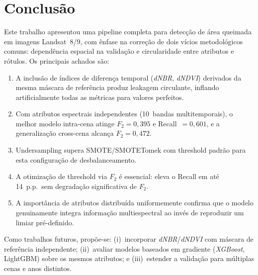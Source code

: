 \documentclass[conference]{IEEEtran}
\begin{document}
\section{Conclusão}

Este trabalho apresentou uma pipeline completa para detecção de área queimada
em imagens Landsat~8/9, com ênfase na correção de dois vícios metodológicos
comuns: dependência espacial na validação e circularidade entre atributos e
rótulos. Os principais achados são:

\begin{enumerate}
  \item A inclusão de índices de diferença temporal (\textit{dNBR}, \textit{dNDVI})
        derivados da mesma máscara de referência produz leakagem circulante,
        inflando artificialmente todas as métricas para valores perfeitos.
  \item Com atributos espectrais independentes (10~bandas multitemporais),
        o melhor modelo intra-cena atinge $F_2 = 0{,}395$ e Recall~$= 0{,}601$,
        e a generalização cross-cena alcança $F_2 = 0{,}472$.
  \item Undersampling supera SMOTE/SMOTETomek com threshold padrão para
        esta configuração de desbalanceamento.
  \item A otimização de threshold via $F_2$ é essencial: eleva o Recall em
        até 14~p.p.\ sem degradação significativa de $F_2$.
  \item A importância de atributos distribuída uniformemente confirma que
        o modelo genuinamente integra informação multiespectral ao invés
        de reproduzir um limiar pré-definido.
\end{enumerate}

Como trabalhos futuros, propõe-se: (i)~incorporar \textit{dNBR}/\textit{dNDVI}
com máscara de referência independente; (ii)~avaliar modelos baseados em
gradiente (\textit{XGBoost}, LightGBM) sobre os mesmos atributos; e
(iii)~estender a validação para múltiplas cenas e anos distintos.
\end{document}
